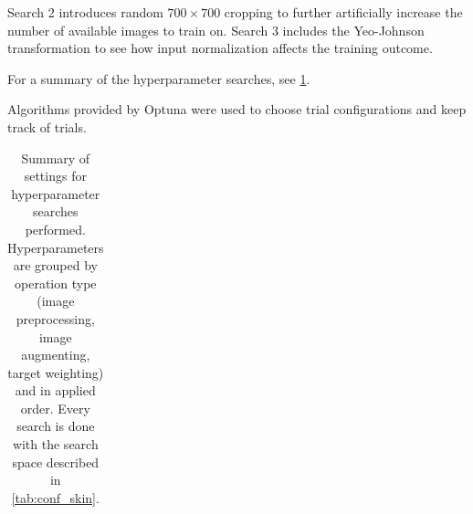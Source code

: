 Search 2 introduces random $700\times700$ cropping to further artificially increase the number of available images to train on.
Search 3 includes the Yeo-Johnson transformation to see how input normalization affects the training outcome.

For a summary of the hyperparameter searches, see \cref{tab:skin_studies}.

Algorithms provided by Optuna \cite{Akiba2019} were used to choose trial configurations and keep track of trials.

\begin{table}
    \caption[\textsc{Skinstression} hyperparameter search studies]{
        Summary of settings for hyperparameter searches performed.
        Hyperparameters are grouped by operation type (image preprocessing, image augmenting, target weighting) and in applied order.
        Every search is done with the search space described in \cref{tab:conf_skin}.
    }
    \label{tab:skin_studies}
    \begin{tabular}{lcccc}


\end{tabular}
\end{table}
